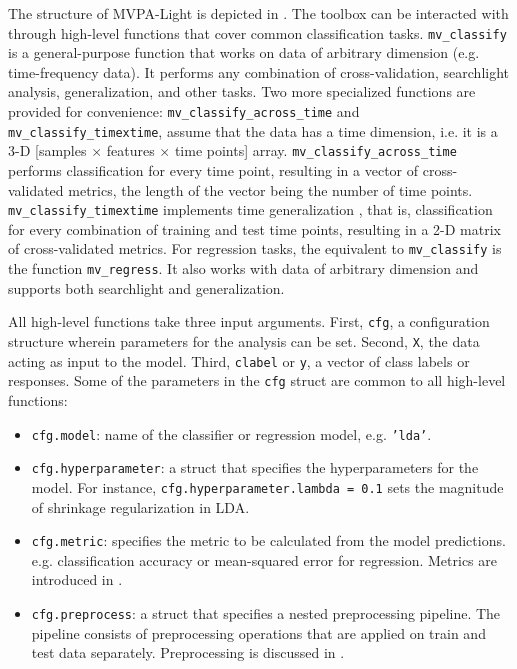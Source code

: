 \documentclass[utf8]{frontiersSCNS} %
\newcommand{\ttt}[1]{\texttt{#1}}
\begin{document}
The structure of MVPA-Light is depicted in . The toolbox can be interacted with through high-level functions that cover common classification tasks. \ttt{mv\_classify} is a  general-purpose function that works on data of arbitrary dimension (e.g. time-frequency data). It performs any combination of cross-validation, searchlight analysis, generalization, and other tasks. Two more specialized functions are provided for convenience: \ttt{mv\_classify\_across\_time}  and \ttt{mv\_classify\_timextime}, assume that the data has a time dimension, i.e. it is a 3-D [samples $\times$ features $\times$ time points] array. \ttt{mv\_classify\_across\_time} performs classification for every time point, resulting in a vector of cross-validated metrics, the length of the vector being the number of time points. \ttt{mv\_classify\_timextime} implements time generalization \citep{King2014}, that is, classification for every combination of training and test time points, resulting in a 2-D matrix of cross-validated metrics. For regression tasks, the equivalent to \ttt{mv\_classify} is the function \ttt{mv\_regress}. It also works with data of arbitrary dimension and supports both searchlight and generalization.

All high-level functions take three input arguments. First, \ttt{cfg}, a configuration structure wherein parameters for the analysis can be set. Second, \ttt{X}, the data acting as input to the model. Third, \ttt{clabel} or \ttt{y}, a vector of class labels or responses. Some of the parameters in the \ttt{cfg} struct are common  to all high-level functions:

\begin{itemize}
    \item \ttt{cfg.model}: name of the classifier or regression model, e.g. \ttt{'lda'}.
    \item \ttt{cfg.hyperparameter}: a struct that specifies the hyperparameters for the model. For instance, \ttt{cfg.hyperparameter.lambda = 0.1} sets the magnitude of shrinkage regularization in LDA.
    \item \ttt{cfg.metric}: specifies the metric to be calculated from the model predictions. e.g. classification accuracy or mean-squared error for regression. Metrics are introduced in .
    \item \ttt{cfg.preprocess}: a struct that specifies a nested preprocessing pipeline. The pipeline consists of preprocessing operations that are applied on train and test data separately. Preprocessing is discussed in .
\end{itemize}
\end{document}
